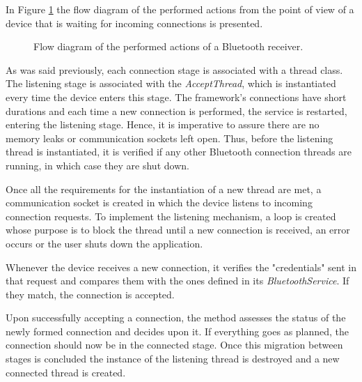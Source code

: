 In Figure \ref{fig:btreceiver} the flow diagram of the performed actions from the point of view of a device that is waiting for incoming connections is presented.

\begin{figure}[ht]
	\noindent{}
	\caption{\label{fig:btreceiver} Flow diagram of the performed actions of a Bluetooth receiver.}
\end{figure}

As was said previously, each connection stage is associated with a thread class. The listening stage is associated with the \textit{AcceptThread}, which is instantiated every time the device enters this stage. The framework's connections have short durations and each time a new connection is performed, the service is restarted, entering the listening stage. Hence, it is imperative to assure there are no memory leaks or communication sockets left open. Thus, before the listening thread is instantiated, it is verified if any other Bluetooth connection threads are running, in which case they are shut down.

Once all the requirements for the instantiation of a new thread are met, a communication socket is created in which the device listens to incoming connection requests. To implement the listening mechanism, a loop is created whose purpose is to block the thread until a new connection is received, an error occurs or the user shuts down the application.

Whenever the device receives a new connection, it verifies the "credentials" sent in that request and compares them with the ones defined in its \textit{BluetoothService}. If they match, the connection is accepted.

Upon successfully accepting a connection, the method assesses the status of the newly formed connection and decides upon it. If everything goes as planned, the connection should now be in the connected stage. Once this migration between stages is concluded the instance of the listening thread is destroyed and a new connected thread is created.

